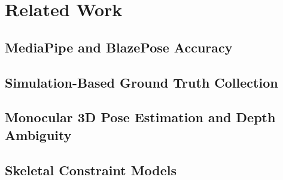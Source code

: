 \documentclass[twocolumn]{article}
\begin{document}
\section{Related Work}


\subsection{MediaPipe and BlazePose Accuracy}

\subsection{Simulation-Based Ground Truth Collection}

\subsection{Monocular 3D Pose Estimation and Depth Ambiguity}

\subsection{Skeletal Constraint Models}

\end{document}
